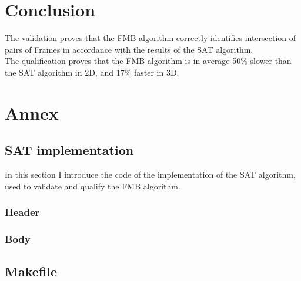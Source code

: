 \documentclass[12pt, a4paper]{article}
\begin{document}
\section{Conclusion}

The validation proves that the FMB algorithm correctly identifies intersection of pairs of Frames in accordance with the results of the SAT algorithm.\\

The qualification proves that the FMB algorithm is in average 50\% slower than the SAT algorithm in 2D, and 17\% faster in 3D.\\

\section{Annex}

\subsection{SAT implementation}
\label{sat_implementation}

In this section I introduce the code of the implementation of the SAT algorithm, used to validate and qualify the FMB algorithm.\\

\subsubsection{Header}

\begin{scriptsize}
\begin{ttfamily}

\end{ttfamily}
\end{scriptsize}

\subsubsection{Body}

\begin{scriptsize}
\begin{ttfamily}

\end{ttfamily}
\end{scriptsize}

\subsection{Makefile}
\end{document}
